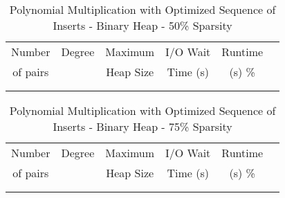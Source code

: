 \documentclass[11pt, one-sided]{amsart}
\begin{document}
\begin{table}[htbp]
   \centering
      \caption{Polynomial Multiplication with Optimized Sequence of Inserts - Binary Heap - 50\% Sparsity}
   \begin{tabular}{|c|c|c|c|c|c|}
   	\hline
		 Number   & 	Degree	& Maximum 	& I/O Wait		& Runtime 	 \\ 
		 of pairs 	&			& Heap Size	& Time (s)		&	(s)		 		\%				\\ \hline
		 		&			&			&			&						\\
		 		&			&			&			&						\\
   \end{tabular}
   \label{tab:booktabs}
\end{table}

\begin{table}[htbp]
   \centering
      \caption{Polynomial Multiplication with Optimized Sequence of Inserts - Binary Heap - 75\% Sparsity}
   \begin{tabular}{|c|c|c|c|c|c|}
   	\hline
		 Number   & 	Degree	& Maximum & I/O Wait		& Runtime 	 \\ 
		 of pairs 	&			& Heap Size	& Time (s)		&	(s)		 		\%				\\ \hline
		 		&			&			&			&						\\
		 		&			&			&			&						\\
   \end{tabular}
   \label{tab:booktabs}
\end{table}


\newpage

\end{document}
